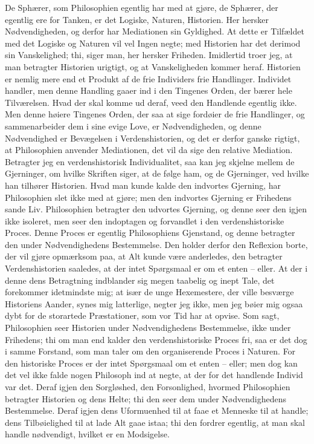 \documentclass[12pt,a4paper]{article}
\begin{document}
De Sphærer, som Philosophien egentlig har med at gjøre, de Sphærer, der egentlig ere for Tanken, er det Logiske, Naturen, Historien. Her hersker Nødvendigheden, og derfor har Mediationen sin Gyldighed. At dette er Tilfældet med det Logiske og Naturen vil vel Ingen negte; med Historien har det derimod sin Vanskelighed; thi, siger man, her hersker Friheden. Imidlertid troer jeg, at man betragter Historien urigtigt, og at Vanskeligheden kommer heraf. Historien er nemlig mere end et Produkt af de frie Individers frie Handlinger. Individet handler, men denne Handling gaaer ind i den Tingenes Orden, der bærer hele Tilværelsen. Hvad der skal komme ud deraf, veed den Handlende egentlig ikke. Men denne høiere Tingenes Orden, der saa at sige fordøier de frie Handlinger, og sammenarbeider dem i sine evige Love, er Nødvendigheden, og denne Nødvendighed er Bevægelsen i Verdenshistorien, og det er derfor ganske rigtigt, at Philosophien anvender Mediationen, det vil da sige den relative Mediation. Betragter jeg en verdenshistorisk Individualitet, saa kan jeg skjelne mellem de Gjerninger, om hvilke Skriften siger, at de følge ham, og de Gjerninger, ved hvilke han tilhører Historien. Hvad man kunde kalde den indvortes Gjerning, har Philosophien slet ikke med at gjøre; men den indvortes Gjerning er Frihedens sande Liv. Philosophien betragter den udvortes Gjerning, og denne seer den igjen ikke isoleret, men seer den indoptagen og forvandlet i den verdenshistoriske Proces. Denne Proces er egentlig Philosophiens Gjenstand, og denne betragter den under Nødvendighedens Bestemmelse. Den holder derfor den Reflexion borte, der vil gjøre opmærksom paa, at Alt kunde være anderledes, den betragter Verdenshistorien saaledes, at der intet Spørgsmaal er om et enten – eller. At der i denne dens Betragtning indblander sig megen taabelig og inept Tale, det forekommer idetmindste mig; at især de unge Hexemestere, der ville besværge Historiens Aander, synes mig latterlige, negter jeg ikke, men jeg bøier mig ogsaa dybt for de storartede Præstationer, som vor Tid har at opvise. Som sagt, Philosophien seer Historien under Nødvendighedens Bestemmelse, ikke under Frihedens; thi om man end kalder den verdenshistoriske Proces fri, saa er det dog i samme Forstand, som man taler om den organiserende Proces i Naturen. For den historiske Proces er der intet Spørgsmaal om et enten – eller; men dog kan det vel ikke falde nogen Philosoph ind at negte, at der for det handlende Individ var det. Deraf igjen den Sorgløshed, den Forsonlighed, hvormed Philosophien betragter Historien og dens Helte; thi den seer dem under Nødvendighedens Bestemmelse. Deraf igjen dens Uformuenhed til at faae et Menneske til at handle; dens Tilbøielighed til at lade Alt gaae istaa; thi den fordrer egentlig, at man skal handle nødvendigt, hvilket er en Modsigelse.
\end{document}
